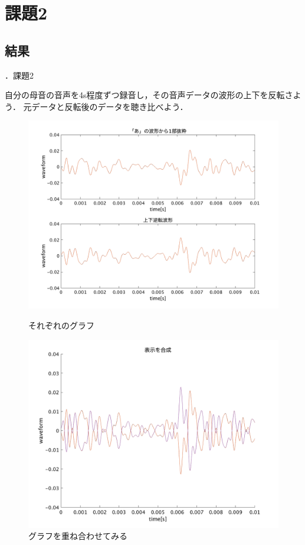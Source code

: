 \documentclass[aspectratio=43]{beamer}
\newcommand{\showsec}{\thesection ．}
\begin{document}
\section{課題2}
\subsection{結果}
\begin{frame}[t]{\showsec 課題2}
    \begin{exampleblock}{}
        自分の母音の音声を4s程度ずつ録音し，その音声データの波形の上下を反転さよう．
        元データと反転後のデータを聴き比べよう．
    \end{exampleblock}
    \begin{figure}
        \centering
        \begin{minipage}[t]{0.49\textwidth}
            \centering
            \includegraphics[keepaspectratio,width=\textwidth]{no2_ans.png}
            \caption{それぞれのグラフ}
        \end{minipage}
        \begin{minipage}[t]{0.49\textwidth}
            \centering
            \includegraphics[keepaspectratio,width=\textwidth]{no2_ans_2.png}
            \caption{グラフを重ね合わせてみる}
        \end{minipage}
    \end{figure}
\end{frame}
\end{document}
